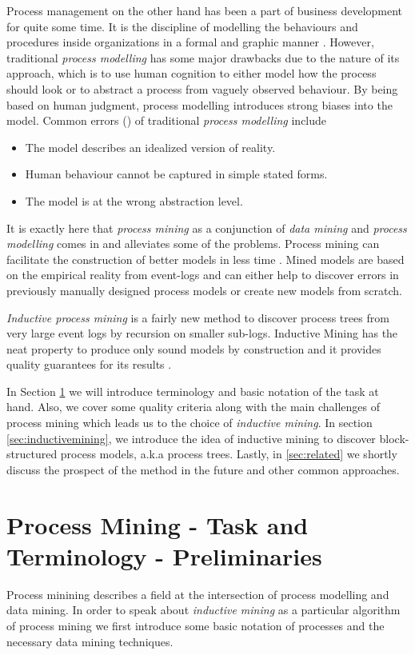 \documentclass[a4paper]{IEEEtran}
\begin{document}
Process management on the other hand has been a part of business development for quite some time. It is the discipline of modelling the behaviours and procedures inside organizations in a formal and graphic manner \cite{jeston2014business}. However, traditional \textit{process modelling} has some major drawbacks due to the nature of its approach, which is to use human cognition to either model how the process should look or to abstract a process from vaguely observed behaviour. By being based on human judgment, process modelling introduces strong biases into the model.
Common errors (\cite{process_mining, pitfalls}) of traditional \textit{process modelling} include
\begin{itemize}
    \item The model describes an idealized version of reality.
    \item Human behaviour cannot be captured in simple stated forms.
    \item The model is at the wrong abstraction level. 
\end{itemize}

It is exactly here that \textit{process mining} as a conjunction of \textit{data mining} and \textit{process modelling} comes in and alleviates some of the problems. 
Process mining can facilitate the construction of better models in less time \cite{process_mining}. Mined models are based on the empirical reality from event-logs and can either help to discover errors in previously manually designed process models or create new models from scratch.

\textit{Inductive process mining} is a fairly new method to discover process trees from very large event logs by recursion on smaller sub-logs. Inductive Mining has the neat property to produce only sound models by construction and it provides quality guarantees for its results \cite{leemans2015scalable, inductivemining-constructive}.

In Section \ref{sec:terminology} we will introduce terminology and basic notation of the task at hand. Also, we cover some quality criteria along with the main challenges of process mining which leads us to the choice of \textit{inductive mining}. In section \ref{sec:inductivemining}, we introduce the idea of inductive mining to discover block-structured process models, a.k.a process trees. Lastly, in \ref{sec:related} we shortly discuss the prospect of the method in the future and other common approaches.

\section{Process Mining - Task and Terminology - Preliminaries}
\label{sec:terminology}
Process minining describes a field at the intersection of process modelling and data mining. In order to speak about \textit{inductive mining} as a particular algorithm of process mining we first introduce some basic notation of processes and the necessary data mining techniques. 
\end{document}
